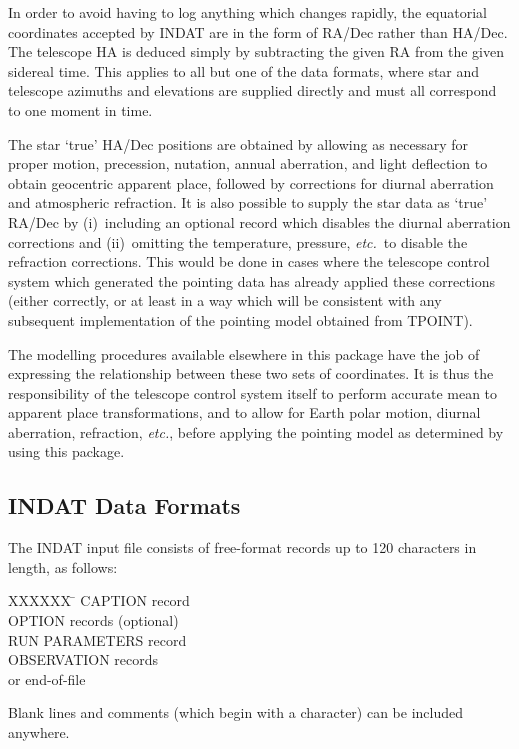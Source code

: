 In order to avoid having to log anything which changes
rapidly, the equatorial coordinates accepted by INDAT
are in the form of RA/Dec rather than HA/Dec.  The telescope HA
is deduced simply by subtracting the given RA from the given
sidereal time.  This applies to all but one of the data formats,
where star and telescope azimuths and elevations are supplied
directly and must all correspond to one moment in time.

The star `true' HA/Dec positions are obtained by allowing
as necessary for proper motion, precession, nutation,
annual aberration, and light deflection to obtain geocentric apparent
place, followed by corrections for diurnal aberration and
atmospheric refraction.  It is also possible to supply the star
data as `true' RA/Dec by (i)~including
an optional record which disables the diurnal
aberration corrections and (ii)~omitting the temperature, pressure,
{\it etc.}\ to disable the refraction corrections.  This would be done
in cases where the telescope control system which generated the
pointing data has already applied these corrections (either
correctly, or at least in a way which will be consistent with
any subsequent implementation of the pointing model obtained
from TPOINT).

The modelling procedures available elsewhere in this package have
the job of expressing the relationship between these two sets of
coordinates.  It is thus the responsibility of the
telescope control system
itself to perform accurate mean to apparent place transformations,
and to allow for Earth polar motion, diurnal aberration, refraction,
{\it etc.}, before applying the pointing model as determined by using
this package.

\subsection{INDAT Data Formats}
The INDAT
input file consists of free-format records up to 120 characters
in length, as follows:
\begin{tabs}
XXXXXX \= \kill
\> CAPTION record \\
\> OPTION records (optional) \\
\> RUN PARAMETERS record \\
\> OBSERVATION records \\
\>  or end-of-file
\end{tabs}

Blank lines and comments (which begin with a \fstring{!} character)
can be included anywhere.

